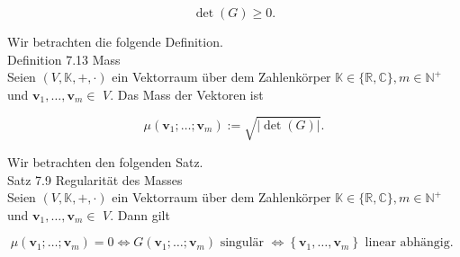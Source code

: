 \documentclass[10pt]{article}
\begin{document}
\begin{equation*}
\operatorname{det}(G) \geq 0 . \tag{7.69}
\end{equation*}


Wir betrachten die folgende Definition.\\
Definition 7.13 Mass\\
Seien $(V, \mathbb{K},+, \cdot)$ ein Vektorraum über dem Zahlenkörper $\mathbb{K} \in\{\mathbb{R}, \mathbb{C}\}, m \in \mathbb{N}^{+}$und $\mathbf{v}_{1}, \ldots, \mathbf{v}_{m} \in$ $V$. Das Mass der Vektoren ist


\begin{equation*}
\mu\left(\mathbf{v}_{1} ; \ldots ; \mathbf{v}_{m}\right):=\sqrt{|\operatorname{det}(G)|} . \tag{7.70}
\end{equation*}


Wir betrachten den folgenden Satz.\\
Satz 7.9 Regularität des Masses\\
Seien $(V, \mathbb{K},+, \cdot)$ ein Vektorraum über dem Zahlenkörper $\mathbb{K} \in\{\mathbb{R}, \mathbb{C}\}, m \in \mathbb{N}^{+}$und $\mathbf{v}_{1}, \ldots, \mathbf{v}_{m} \in$ $V$. Dann gilt


\begin{equation*}
\mu\left(\mathbf{v}_{1} ; \ldots ; \mathbf{v}_{m}\right)=0 \Leftrightarrow G\left(\mathbf{v}_{1} ; \ldots ; \mathbf{v}_{m}\right) \text { singulär } \Leftrightarrow\left\{\mathbf{v}_{1}, \ldots, \mathbf{v}_{m}\right\} \text { linear abhängig. } \tag{7.71}
\end{equation*}
\end{document}
